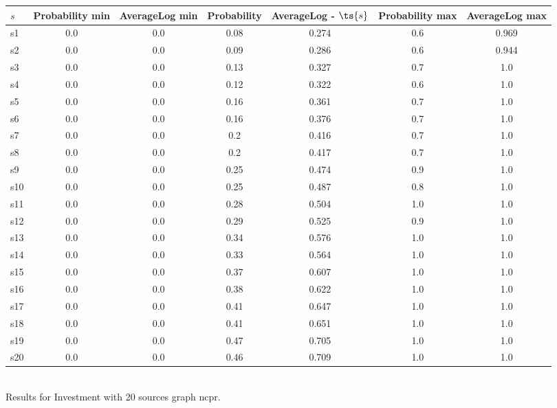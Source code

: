 \documentclass{article}
\begin{document}
\noindent\begin{tabular}{|l|c|c|c|c|c|c|}
\hline
$s$& Probability min & AverageLog min & Probability & AverageLog - $\ts{s}$ & Probability max & AverageLog max\\
\hline
s1 &0.0 & 0.0 & 0.08 & 0.274 & 0.6 & 0.969\\
\hline
s2 &0.0 & 0.0 & 0.09 & 0.286 & 0.6 & 0.944\\
\hline
s3 &0.0 & 0.0 & 0.13 & 0.327 & 0.7 & 1.0\\
\hline
s4 &0.0 & 0.0 & 0.12 & 0.322 & 0.6 & 1.0\\
\hline
s5 &0.0 & 0.0 & 0.16 & 0.361 & 0.7 & 1.0\\
\hline
s6 &0.0 & 0.0 & 0.16 & 0.376 & 0.7 & 1.0\\
\hline
s7 &0.0 & 0.0 & 0.2 & 0.416 & 0.7 & 1.0\\
\hline
s8 &0.0 & 0.0 & 0.2 & 0.417 & 0.7 & 1.0\\
\hline
s9 &0.0 & 0.0 & 0.25 & 0.474 & 0.9 & 1.0\\
\hline
s10 &0.0 & 0.0 & 0.25 & 0.487 & 0.8 & 1.0\\
\hline
s11 &0.0 & 0.0 & 0.28 & 0.504 & 1.0 & 1.0\\
\hline
s12 &0.0 & 0.0 & 0.29 & 0.525 & 0.9 & 1.0\\
\hline
s13 &0.0 & 0.0 & 0.34 & 0.576 & 1.0 & 1.0\\
\hline
s14 &0.0 & 0.0 & 0.33 & 0.564 & 1.0 & 1.0\\
\hline
s15 &0.0 & 0.0 & 0.37 & 0.607 & 1.0 & 1.0\\
\hline
s16 &0.0 & 0.0 & 0.38 & 0.622 & 1.0 & 1.0\\
\hline
s17 &0.0 & 0.0 & 0.41 & 0.647 & 1.0 & 1.0\\
\hline
s18 &0.0 & 0.0 & 0.41 & 0.651 & 1.0 & 1.0\\
\hline
s19 &0.0 & 0.0 & 0.47 & 0.705 & 1.0 & 1.0\\
\hline
s20 &0.0 & 0.0 & 0.46 & 0.709 & 1.0 & 1.0\\
\hline
\end{tabular}\\

\noindent Results for Investment with 20 sources graph ncpr.
\end{document}
